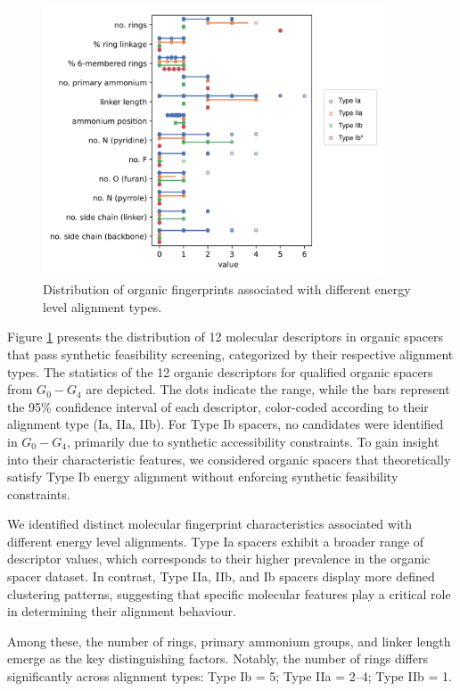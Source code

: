 \begin{figure}[htbp]
    \centering
    \includegraphics[width=0.9\textwidth]{figures/synthesis-feasibility/figure5-11.png}
    \caption{Distribution of organic fingerprints associated with different energy level alignment types.}
    \label{fig:figure5.11}
\end{figure}

Figure \ref{fig:figure5.11} presents the distribution of 12 molecular descriptors in organic spacers that pass synthetic feasibility screening, categorized by their respective alignment types.
The statistics of the 12 organic descriptors for qualified organic spacers from $G_0-G_4$ are depicted. The dots indicate the range, while the bars represent the 95\% confidence interval of each descriptor, color-coded according to their alignment type (Ia, IIa, IIb). For Type Ib spacers, no candidates were identified in $G_0-G_4$, primarily due to synthetic accessibility constraints. To gain insight into their characteristic features, we considered organic spacers that theoretically satisfy Type Ib energy alignment without enforcing synthetic feasibility constraints.

We identified distinct molecular fingerprint characteristics associated with different energy level alignments. Type Ia spacers exhibit a broader range of descriptor values, which corresponds to their higher prevalence in the organic spacer dataset. In contrast, Type IIa, IIb, and Ib spacers display more defined clustering patterns, suggesting that specific molecular features play a critical role in determining their alignment behaviour.

Among these, the number of rings, primary ammonium groups, and linker length emerge as the key distinguishing factors. Notably, the number of rings differs significantly across alignment types: Type Ib = 5; Type IIa = 2–4; Type IIb = 1.

